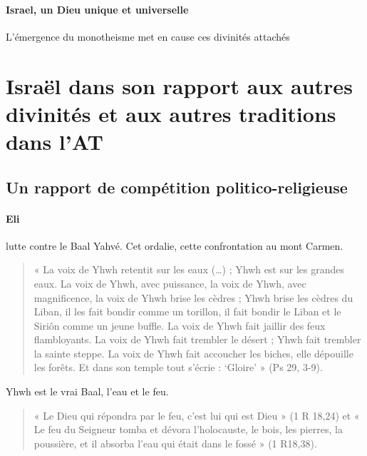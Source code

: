 \paragraph{Israel, un Dieu unique et universelle} L'émergence du monotheisme met en cause ces divinités attachés 


    
    
\section{Israël dans son rapport aux autres divinités et aux autres traditions dans l’AT}

\subsection{Un rapport de compétition politico-religieuse}

\paragraph{Eli} lutte contre le Baal Yahvé. Cet ordalie, cette confrontation au mont Carmen.

\begin{quote}
    « La voix de Yhwh retentit sur les eaux (…) ; Yhwh est sur les grandes eaux. La voix de Yhwh, avec
puissance, la voix de Yhwh, avec magnificence, la voix de Yhwh brise les cèdres ; Yhwh brise les
cèdres du Liban, il les fait bondir comme un torillon, il fait bondir le Liban et le Siriôn comme un
jeune buffle. La voix de Yhwh fait jaillir des feux flambloyants. La voix de Yhwh fait trembler le
désert ; Yhwh fait trembler la sainte steppe. La voix de Yhwh fait accoucher les biches, elle dépouille
les forêts. Et dans son temple tout s’écrie : ‘Gloire’ » (Ps 29, 3-9).
\end{quote}

Yhwh est le vrai Baal, l'eau et le feu. 

\begin{quote}
    « Le Dieu qui répondra par le feu, c’est lui qui est Dieu » (1 R 18,24) et « Le feu du Seigneur tomba et
dévora l’holocauste, le bois, les pierres, la poussière, et il absorba l’eau qui était dans le fossé » (1
R18,38). 
\end{quote}



